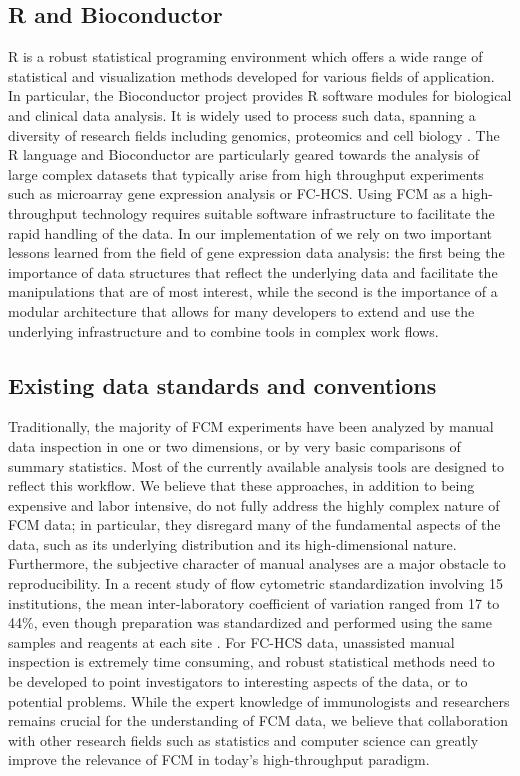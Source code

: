 \documentclass[10pt]{bmc_article}
\newenvironment{bmcformat}{\begin{raggedright}\baselineskip20pt\sloppy\setboolean{publ}{false}}{\end{raggedright}\baselineskip20pt\sloppy}
\begin{document}
\begin{bmcformat}
\subsection*{R and Bioconductor}
R is a robust statistical programing environment which offers a wide
range of statistical and visualization methods developed for various
fields of application. In particular, the Bioconductor project
provides R software modules for biological and clinical data analysis.
It is widely used to process such data, spanning a diversity of
research fields including genomics, proteomics and cell biology
\citep{BIOC}. The R language and Bioconductor are particularly geared
towards the analysis of large complex datasets that typically arise
from high throughput experiments such as microarray gene expression
analysis or FC-HCS. Using FCM as a high-throughput technology requires
suitable software infrastructure to facilitate the rapid handling of
the data. In our implementation of  we rely on two
important lessons learned from the field of gene expression data
analysis: the first being the importance of data structures that
reflect the underlying data and facilitate the manipulations that are
of most interest, while the second is the importance of a modular
architecture that allows for many developers to extend and use the
underlying infrastructure and to combine tools in complex work flows.

\subsection*{Existing data standards and conventions}
Traditionally, the majority of FCM experiments have been analyzed by
manual data inspection in one or two dimensions, or by very basic
comparisons of summary statistics. Most of the currently available
analysis tools are designed to reflect this workflow.  We believe that
these approaches, in addition to being expensive and labor intensive,
do not fully address the highly complex nature of FCM data; in
particular, they disregard many of the fundamental aspects of the
data, such as its underlying distribution and its high-dimensional
nature. Furthermore, the subjective character of manual analyses are a
major obstacle to reproducibility. In a recent study of flow
cytometric standardization involving 15 institutions, the mean
inter-laboratory coefficient of variation ranged from 17 to 44\%, even
though preparation was standardized and performed using the same
samples and reagents at each site \citep{Maecker2005}. For FC-HCS
data, unassisted manual inspection is extremely time consuming, and
robust statistical methods need to be developed to point investigators
to interesting aspects of the data, or to potential problems. While
the expert knowledge of immunologists and researchers remains crucial
for the understanding of FCM data, we believe that collaboration with
other research fields such as statistics and computer science can
greatly improve the relevance of FCM in today's high-throughput
paradigm.


\end{bmcformat}
\end{document}
